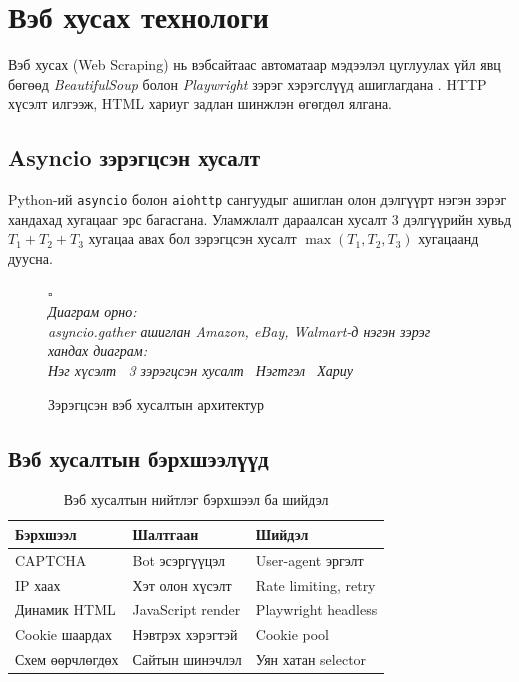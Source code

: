 \documentclass[12pt,a4paper]{report}
\newcommand{\figplaceholder}[2][7cm]{%
  \vspace{8pt}
  \begin{center}
    \colorbox{placeholderbg}{%
      \parbox[c][#1][c]{0.85\textwidth}{\centering
        {\color{darkgray!60}\Large $\square$}\\[8pt]
        {\color{darkgray}\itshape\small Диаграм орно:\\[4pt] #2}}}
  \end{center}
  \vspace{8pt}}
\begin{document}
\section{Вэб хусах технологи}

Вэб хусах (Web Scraping) нь вэбсайтаас автоматаар мэдээлэл цуглуулах үйл явц бөгөөд \textit{BeautifulSoup} болон \textit{Playwright} зэрэг хэрэгслүүд ашиглагдана \cite{beautifulsoup}. HTTP хүсэлт илгээж, HTML хариуг задлан шинжлэн өгөгдөл ялгана.

\subsection{Asyncio зэрэгцсэн хусалт}

Python-ий \texttt{asyncio} болон \texttt{aiohttp} сангуудыг ашиглан олон дэлгүүрт нэгэн зэрэг хандахад хугацааг эрс багасгана. Уламжлалт дараалсан хусалт 3 дэлгүүрийн хувьд $T_1 + T_2 + T_3$ хугацаа авах бол зэрэгцсэн хусалт $\max(T_1, T_2, T_3)$ хугацаанд дуусна.

\begin{figure}[H]
  \centering
  \figplaceholder[8cm]{asyncio.gather ашиглан Amazon, eBay, Walmart-д нэгэн зэрэг хандах диаграм:\\ Нэг хүсэлт \textrightarrow\ 3 зэрэгцсэн хусалт \textrightarrow\ Нэгтгэл \textrightarrow\ Хариу}
  \caption{Зэрэгцсэн вэб хусалтын архитектур}
  \label{fig:concurrent_scraping}
\end{figure}

\subsection{Вэб хусалтын бэрхшээлүүд}

\begin{table}[H]
\centering
\caption{Вэб хусалтын нийтлэг бэрхшээл ба шийдэл}
\label{tab:scraping_challenges}
\begin{tabularx}{\textwidth}{@{}lXX@{}}
\toprule
\textbf{Бэрхшээл} & \textbf{Шалтгаан} & \textbf{Шийдэл} \\
\midrule
CAPTCHA & Bot эсэргүүцэл & User-agent эргэлт \\
IP хаах & Хэт олон хүсэлт & Rate limiting, retry \\
Динамик HTML & JavaScript render & Playwright headless \\
Cookie шаардах & Нэвтрэх хэрэгтэй & Cookie pool \\
Схем өөрчлөгдөх & Сайтын шинэчлэл & Уян хатан selector \\
\bottomrule
\end{tabularx}
\end{table}
\end{document}
